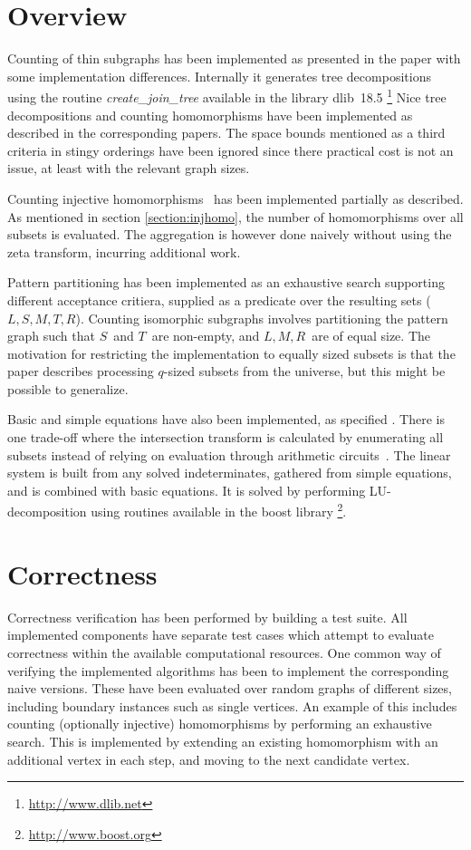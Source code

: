 \documentclass[a4paper,11pt]{report}
\theoremstyle{plain}
\theoremstyle{definition}
\begin{document}
\section{Overview}
Counting of thin subgraphs has been implemented as presented in the paper \cite{BHKK13} with some implementation differences.
Internally it generates tree decompositions using the routine \emph{create\_join\_tree} available in the library dlib 18.5 \footnote{\url{http://www.dlib.net}}
Nice tree decompositions \cite{kintali12} and counting homomorphisms \cite{DST02} have been implemented as described in the corresponding papers.
The space bounds mentioned as a third criteria in stingy orderings have been ignored since there practical cost is not an issue, at least with the relevant graph sizes.

Counting injective homomorphisms \cite{FLRRS12} has been implemented partially as described.
As mentioned in section \ref{section:injhomo}, the number of homomorphisms over all subsets is evaluated.
The aggregation is however done naively without using the zeta transform, incurring additional work.

Pattern partitioning has been implemented as an exhaustive search supporting different acceptance critiera, supplied as a predicate over the resulting sets ($L, S, M, T, R$).
Counting isomorphic subgraphs involves partitioning the pattern graph such that $S$ and $T$ are non-empty, and $L, M, R$ are of equal size.
The motivation for restricting the implementation to equally sized subsets is that the paper describes processing $q$-sized subsets from the universe, but this might be possible to generalize.

Basic and simple equations have also been implemented, as specified \cite{BHKK13}.
There is one trade-off where the intersection transform is calculated by enumerating all subsets instead of relying on evaluation through arithmetic circuits~\cite{BHKK08}.
The linear system is built from any solved indeterminates, gathered from simple equations, and is combined with basic equations.
It is solved by performing LU-decomposition using routines available in the boost library \footnote{\url{http://www.boost.org}}.

\section{Correctness}
Correctness verification has been performed by building a test suite.
All implemented components have separate test cases which attempt to evaluate correctness within the available computational resources.
One common way of verifying the implemented algorithms has been to implement the corresponding naive versions.
These have been evaluated over random graphs of different sizes, including boundary instances such as single vertices.
An example of this includes counting (optionally injective) homomorphisms by performing an exhaustive search.
This is implemented by extending an existing homomorphism with an additional vertex in each step, and moving to the next candidate vertex.
\end{document}
